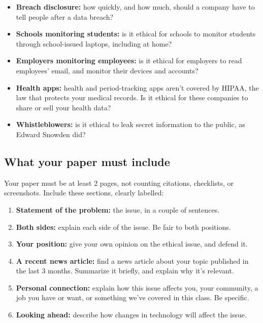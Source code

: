 \documentclass[12pt]{article}
\begin{document}
\begin{itemize}
    \item \textbf{Breach disclosure:} how quickly, and how much, should a company have to tell people after a data breach?
    \item \textbf{Schools monitoring students:} is it ethical for schools to monitor students through school-issued laptops, including at home?
    \item \textbf{Employers monitoring employees:} is it ethical for employers to read employees' email, and monitor their devices and accounts?
    \item \textbf{Health apps:} health and period-tracking apps aren't covered by HIPAA, the law that protects your medical records. Is it ethical for these companies to share or sell your health data?
    \item \textbf{Whistleblowers:} is it ethical to leak secret information to the public, as Edward Snowden did?
\end{itemize}

\subsection*{What your paper must include}
Your paper must be at least 2 pages, not counting citations, checklists, or screenshots. Include these sections, clearly labelled:
\begin{enumerate}
    \item \textbf{Statement of the problem:} the issue, in a couple of sentences.
    \item \textbf{Both sides:} explain each side of the issue. Be fair to both positions.
    \item \textbf{Your position:} give your own opinion on the ethical issue, and defend it.
    \item \textbf{A recent news article:} find a news article about your topic published in the last 3 months. Summarize it briefly, and explain why it's relevant.
    \item \textbf{Personal connection:} explain how this issue affects you, your community, a job you have or want, or something we've covered in this class. Be specific.
    \item \textbf{Looking ahead:} describe how changes in technology will affect the issue.
\end{enumerate}
\end{document}
